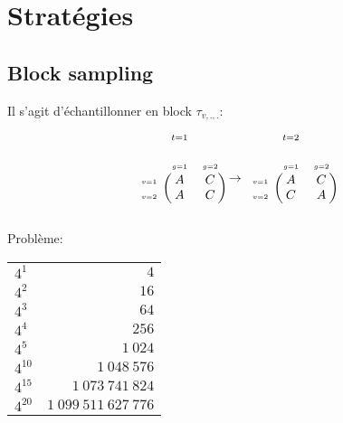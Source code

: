 \documentclass{beamer}
\newcommand{\fr}[1]{#1}
\newcommand{\en}[1]{}
\begin{document}
\section{\en{Improvements}\fr{Stratégies}}






\subsection{Block sampling}

\begin{frame}
Il s'agit d'échantillonner en block $\tau_{v,.,.}$:


$$\overset{t=1}{\begin{blockarray}{ccc}
    &&\\&\scriptscriptstyle g=1&\scriptscriptstyle g=2\\
    \begin{block}{c(cc)}
 {\scriptscriptstyle v=1}&A&C\\   
  {\scriptscriptstyle v=2}&A&C\\   
    \end{block}
\end{blockarray}}  \to \overset{t=2}{\begin{blockarray}{ccc}
    &&\\&\scriptscriptstyle g=1&\scriptscriptstyle g=2\\
    \begin{block}{c(cc)}
 {\scriptscriptstyle v=1}&A&C\\   
  {\scriptscriptstyle v=2}&C&A\\   
    \end{block}
\end{blockarray}}$$

Problème:

\begin{table}[H]
\centering
\begin{tabular}{lr}
  \hline
$4^{1}$&$4$\\$4^{2}$&$16$\\$4^{3}$&$64$\\$4^{4}$&$256$\\$4^{5}$&$1~024$\\$4^{10}$&$1~048~576$\\$4^{15}$&$1~073~741~824$\\$4^{20}$&$1~099~511~627~776$\\   \hline
\end{tabular}
\end{table}

\end{frame}
\end{document}
